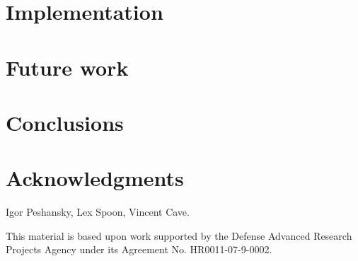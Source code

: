 \documentclass[nocopyrightspace,preprint,9pt]{sigplanconf}
\begin{document}
\section{Implementation}
\label{sec:implementation}


\section{Future work}
\label{sec:future}


\section{Conclusions}
\label{sec:conclusions}


\section*{Acknowledgments}

Igor Peshansky,
Lex Spoon,
Vincent Cave.

This material is based upon work supported by the Defense
Advanced Research Projects Agency under its Agreement No.
HR0011-07-9-0002.




\balance


% 
\end{document}
